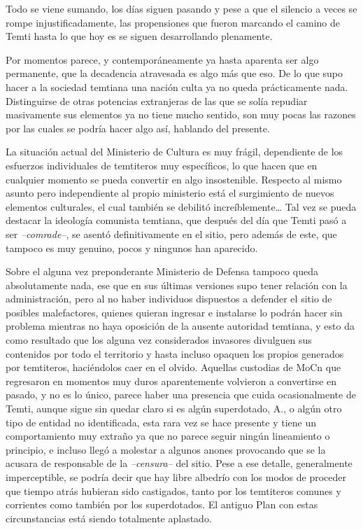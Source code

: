 \documentclass[
  spanish,
]{book}
\begin{document}
Todo se viene sumando, los días siguen pasando y pese a que el silencio a veces se rompe injustificadamente, las propensiones que fueron marcando el camino de Temti hasta lo que hoy es se siguen desarrollando plenamente.

Por momentos parece, y contemporáneamente ya hasta aparenta ser algo permanente, que la decadencia atravesada es algo más que eso. De lo que supo hacer a la sociedad temtiana una nación culta ya no queda prácticamente nada. Distinguirse de otras potencias extranjeras de las que se solía repudiar masivamente sus elementos ya no tiene mucho sentido, son muy pocas las razones por las cuales se podría hacer algo así, hablando del presente.

La situación actual del Ministerio de Cultura es muy frágil, dependiente de los esfuerzos individuales de temtiteros muy específicos, lo que hacen que en cualquier momento se pueda convertir en algo insostenible. Respecto al mismo asunto pero independiente al propio ministerio está el surgimiento de nuevos elementos culturales, el cual también se debilitó increíblemente\ldots{} Tal vez se pueda destacar la ideología comunista temtiana, que después del día que Temti pasó a ser \emph{--comrade--}, se asentó definitivamente en el sitio, pero además de este, que tampoco es muy genuino, pocos y ningunos han aparecido.

Sobre el alguna vez preponderante Ministerio de Defensa tampoco queda absolutamente nada, ese que en sus últimas versiones supo tener relación con la administración, pero al no haber individuos dispuestos a defender el sitio de posibles malefactores, quienes quieran ingresar e instalarse lo podrán hacer sin problema mientras no haya oposición de la ausente autoridad temtiana, y esto da como resultado que los alguna vez considerados invasores divulguen sus contenidos por todo el territorio y hasta incluso opaquen los propios generados por temtiteros, haciéndolos caer en el olvido. Aquellas custodias de MoCn que regresaron en momentos muy duros aparentemente volvieron a convertirse en pasado, y no es lo único, parece haber una presencia que cuida ocasionalmente de Temti, aunque sigue sin quedar claro si es algún superdotado, A., o algún otro tipo de entidad no identificada, esta rara vez se hace presente y tiene un comportamiento muy extraño ya que no parece seguir ningún lineamiento o principio, e incluso llegó a molestar a algunos anones provocando que se la acusara de responsable de la \emph{--censura--} del sitio. Pese a ese detalle, generalmente imperceptible, se podría decir que hay libre albedrío con los modos de proceder que tiempo atrás hubieran sido castigados, tanto por los temtiteros comunes y corrientes como también por los superdotados. El antiguo Plan con estas circunstancias está siendo totalmente aplastado.
\end{document}
